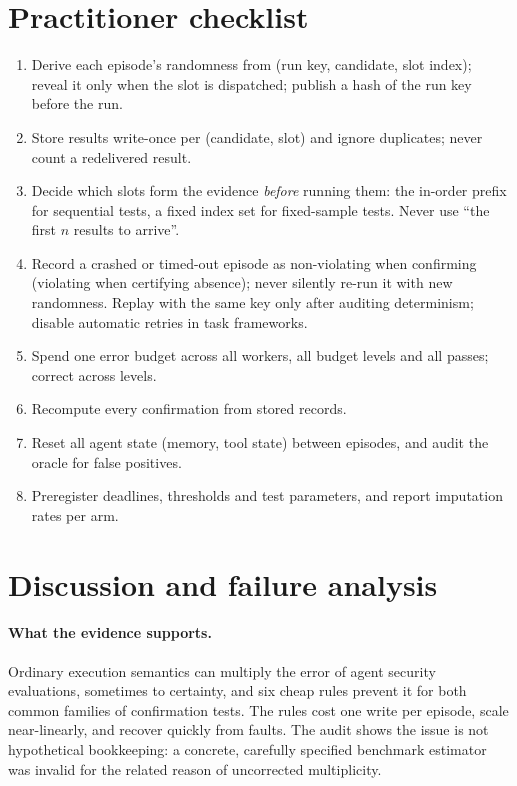 \documentclass[pdflatex,sn-mathphys-num]{sn-jnl}
\theoremstyle{thmstyleone}
\theoremstyle{thmstyletwo}
\theoremstyle{thmstylethree}
\begin{document}
\section{Practitioner checklist}\label{sec:checklist}
\begin{enumerate}
\item Derive each episode's randomness from (run key, candidate, slot index); reveal it only when the slot is dispatched; publish a hash of the run key before the run.
\item Store results write-once per (candidate, slot) and ignore duplicates; never count a redelivered result.
\item Decide which slots form the evidence \emph{before} running them: the in-order prefix for sequential tests, a fixed index set for fixed-sample tests. Never use ``the first $n$ results to arrive''.
\item Record a crashed or timed-out episode as non-violating when confirming (violating when certifying absence); never silently re-run it with new randomness. Replay with the same key only after auditing determinism; disable automatic retries in task frameworks.
\item Spend one error budget across all workers, all budget levels and all passes; correct across levels.
\item Recompute every confirmation from stored records.
\item Reset all agent state (memory, tool state) between episodes, and audit the oracle for false positives.
\item Preregister deadlines, thresholds and test parameters, and report imputation rates per arm.
\end{enumerate}

\section{Discussion and failure analysis}\label{sec:discussion}

\paragraph{What the evidence supports.} Ordinary execution semantics can multiply the error of agent security evaluations, sometimes to certainty, and six cheap rules prevent it for both common families of confirmation tests. The rules cost one write per episode, scale near-linearly, and recover quickly from faults. The audit shows the issue is not hypothetical bookkeeping: a concrete, carefully specified benchmark estimator was invalid for the related reason of uncorrected multiplicity.
\end{document}
